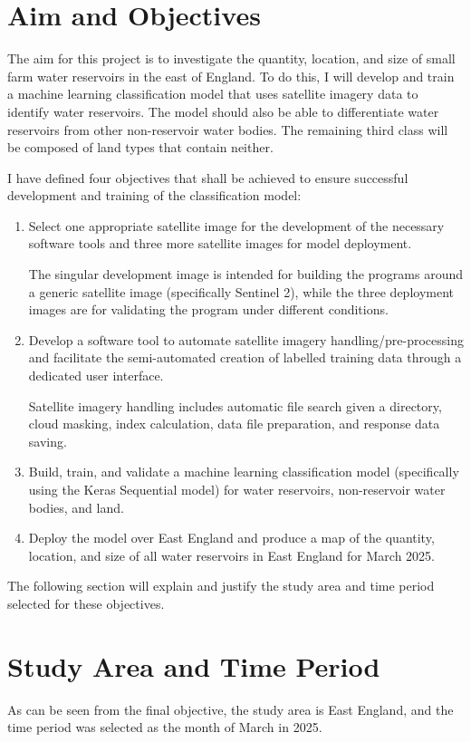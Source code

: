 \section{Aim and Objectives}
The aim for this project is to investigate the quantity, location, and size of small farm water reservoirs in the east of England. To do this, I will develop and train a machine learning classification model that uses satellite imagery data to identify water reservoirs. The model should also be able to differentiate water reservoirs from other non-reservoir water bodies. The remaining third class will be composed of land types that contain neither. 

I have defined four objectives that shall be achieved to ensure successful development and training of the classification model: 
\begin{enumerate}
    \item Select one appropriate satellite image for the development of the necessary software tools and three more satellite images for model deployment. 

    The singular development image is intended for building the programs around a generic satellite image (specifically Sentinel 2), while the three deployment images are for validating the program under different conditions. 
    \item Develop a software tool to automate satellite imagery handling/pre-processing and facilitate the semi-automated creation of labelled training data through a dedicated user interface. 
    
    Satellite imagery handling includes automatic file search given a directory, cloud masking, index calculation, data file preparation, and response data saving. 
    \item Build, train, and validate a machine learning classification model (specifically using the Keras Sequential model) for water reservoirs, non-reservoir water bodies, and land.
    \item Deploy the model over East England and produce a map of the quantity, location, and size of all water reservoirs in East England for March 2025. 
\end{enumerate}

The following section will explain and justify the study area and time period selected for these objectives.

\section{Study Area and Time Period}
As can be seen from the final objective, the study area is East England, and the time period was selected as the month of March in 2025. 

